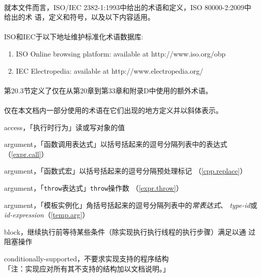 \paragraph{}
就本文件而言，ISO/IEC 2382-1:1993中给出的术语和定义，ISO 80000-2:2009中给出的术
语，定义和符号，以及以下内容适用。

\paragraph{}
ISO和IEC于以下地址维护标准化术语数据库:
\begin{enumerate}
  \item{ISO Online browsing platform: available at http://www.iso.org/obp}
  \item{IEC Electropedia: available at http://www.electropedia.org/}
\end{enumerate}

\paragraph{}
第20.3节定义了仅在从第20章到第33章和附录D中使用的额外术语。

\paragraph{}
仅在本文档内一部分使用的术语在它们出现的地方定义并以斜体表示。


\noindent access，「执行时行为」读或写对象的值

\noindent argument，「函数调用表达式」以括号括起来的逗号分隔列表中的表达式
（\ref{expr.call}）

\noindent argument，「函数式宏」以括号括起来的逗号分隔预处理标记
（\ref{cpp.replace}）

\noindent argument，「\texttt{throw}表达式」\texttt{throw}操作数
（\ref{expr.throw}）

\noindent argument，「模板实例化」角括号括起来的逗号分隔列表中的\textit{常表达式}、
\textit{type-id}或\textit{id-expression}（\ref{temp.arg}）

\noindent block，继续执行前等待某些条件（除实现执行执行线程的执行步骤）满足以通
过阻塞操作

\noindent conditionally-supported，不要求实现支持的程序结构 \\
「注：实现应对所有其不支持的结构加以文档说明。」

